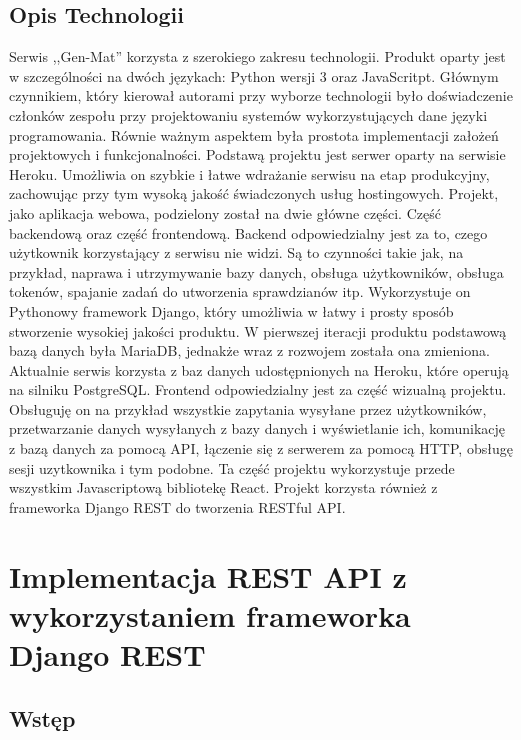 \documentclass[oneside,polski,logo,indent]{amuthesis}
\begin{document}
\section{Opis Technologii}
Serwis ,,Gen-Mat'' korzysta z szerokiego zakresu technologii. Produkt oparty jest w szczególności na dwóch językach: Python wersji 3 oraz JavaScritpt. Głównym czynnikiem, który kierował autorami przy wyborze technologii było doświadczenie członków zespołu przy projektowaniu systemów wykorzystujących dane języki programowania. Równie ważnym aspektem była prostota implementacji założeń projektowych i funkcjonalności. Podstawą projektu jest serwer oparty na serwisie Heroku. Umożliwia on szybkie i łatwe wdrażanie serwisu na etap produkcyjny, zachowując przy tym wysoką jakość świadczonych usług hostingowych. Projekt, jako aplikacja webowa, podzielony został na dwie główne części. Część backendową oraz część frontendową.     
Backend odpowiedzialny jest za to, czego użytkownik korzystający z serwisu nie widzi. Są to czynności takie jak, na przykład, naprawa i utrzymywanie bazy danych, obsługa użytkowników, obsługa tokenów, spajanie zadań do utworzenia sprawdzianów itp. Wykorzystuje on Pythonowy framework Django, który umożliwia w łatwy i prosty sposób stworzenie wysokiej jakości produktu. W pierwszej iteracji produktu podstawową bazą danych była MariaDB, jednakże wraz z rozwojem została ona zmieniona. Aktualnie serwis korzysta z baz danych udostępnionych na Heroku, które operują na silniku PostgreSQL.   
Frontend odpowiedzialny jest za część wizualną projektu. Obsługuję on na przykład wszystkie zapytania wysyłane przez użytkowników, przetwarzanie danych wysyłanych z bazy danych i wyświetlanie ich, komunikację z bazą danych za pomocą API, łączenie się z serwerem za pomocą HTTP, obsługę sesji uzytkownika i tym podobne. Ta część projektu wykorzystuje przede wszystkim Javascriptową bibliotekę React. Projekt korzysta również z frameworka Django REST do tworzenia RESTful API.


\chapter{Implementacja REST API z wykorzystaniem frameworka Django REST}

\section{Wstęp}
\end{document}
